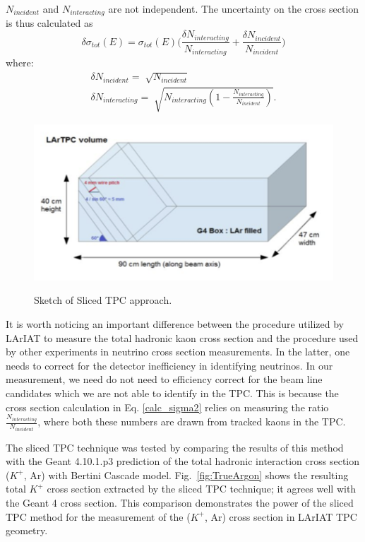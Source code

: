 $N_{incident}$ and $N_{interacting}$ are not independent.
The uncertainty on the cross section is thus calculated as 
\begin{equation}
\delta\sigma_{tot}(E) = \sigma_{tot}(E) \Big(\frac{\delta N_{interacting}}{N_{interacting}}+\frac{\delta N_{incident}}{N_{incident}}\Big) 
\end{equation}
where:
\begin{eqnarray}
\delta N_{incident} = \sqrt[]{N_{incident}} \\
\delta N_{interacting} = \sqrt[]{N_{interacting}(1-\frac{ N_{interacting}}{N_{incident}})}.
\end{eqnarray}

\begin{figure}[htpb]
\centering
\includegraphics[scale=1.25]{images/Lariat/SlicedTPC.png}\\
\caption{Sketch of Sliced TPC approach.}
\label{fig:slicedtpc}
\end{figure}

It is worth noticing an important difference between the procedure utilized by LArIAT to measure the total hadronic kaon cross section and the procedure used by other experiments in neutrino cross section measurements. In the latter, one needs to correct for the detector inefficiency in identifying neutrinos. In our measurement,  we need do not need to efficiency correct for the beam line candidates which we are not able to identify in the TPC. This is because the cross section calculation in Eq. \ref{calc_sigma2}  relies on measuring the ratio $\frac{ N_{interacting}}{N_{incident}}$, where both these numbers are drawn from tracked kaons in the TPC.

The sliced TPC technique was tested by comparing the results of this method with the Geant 4.10.1.p3 prediction of the total hadronic interaction cross section ($K^{+}$, Ar)  with Bertini Cascade model.
Fig.~\ref{fig:TrueArgon} shows the resulting total ${K^+}$ cross section extracted by the sliced TPC technique; it agrees well with the Geant 4  cross section.  This comparison demonstrates the power of the sliced TPC method for the measurement of the ($K^{+}$, Ar) cross section in LArIAT TPC geometry. 



